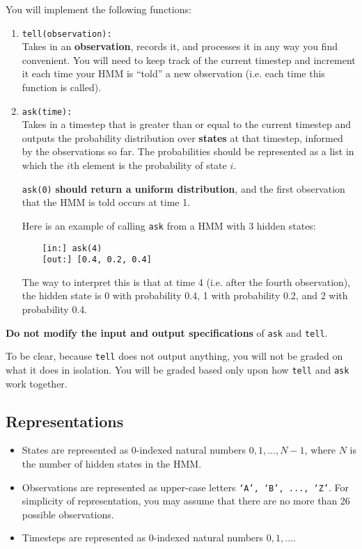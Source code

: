 \documentclass{article}
\begin{document}
You will implement the following functions:
\begin{enumerate}
    \item \texttt{tell(observation):} \\
    Takes in an \textbf{observation}, records it, and processes it in any way you find convenient. You will need to keep track of the current timestep and increment it each time your HMM is ``told'' a new observation (i.e. each time this function is called).

    \item \texttt{ask(time):} \\
    Takes in a timestep that is greater than or equal to the current timestep and outputs the probability distribution over \textbf{states} at that timestep, informed by the observations so far. The probabilities should be represented as a list in which the $i$th element is the probability of state $i$.

    \texttt{ask(0)} \textbf{should return a uniform distribution}, and the first observation that the HMM is told occurs at time 1.

    Here is an example of calling \texttt{ask} from a HMM with 3 hidden states:
    \begin{verbatim}
    [in:] ask(4)
    [out:] [0.4, 0.2, 0.4]
    \end{verbatim}
    The way to interpret this is that at time 4 (i.e. after the fourth observation), the hidden state is 0 with probability 0.4, 1 with probability 0.2, and 2 with probability 0.4.

\end{enumerate}

\textbf{Do not modify the input and output specifications} of \texttt{ask} and \texttt{tell}.

To be clear, because \texttt{tell} does not output anything, you will not be graded on what it does in isolation. You will be graded based only upon how \texttt{tell} and \texttt{ask} work together.

\subsection{Representations}
\begin{itemize}
    \item States are represented as 0-indexed natural numbers $0, 1, \ldots, N - 1$, where $N$ is the number of hidden states in the HMM.
    \item Observations are represented as upper-case letters \texttt{`A', `B', ..., `Z'}.
    For simplicity of representation, you may assume that there are no more than 26 possible observations.
    \item Timesteps are represented as 0-indexed natural numbers $0, 1, \ldots$.
\end{itemize}
\end{document}
